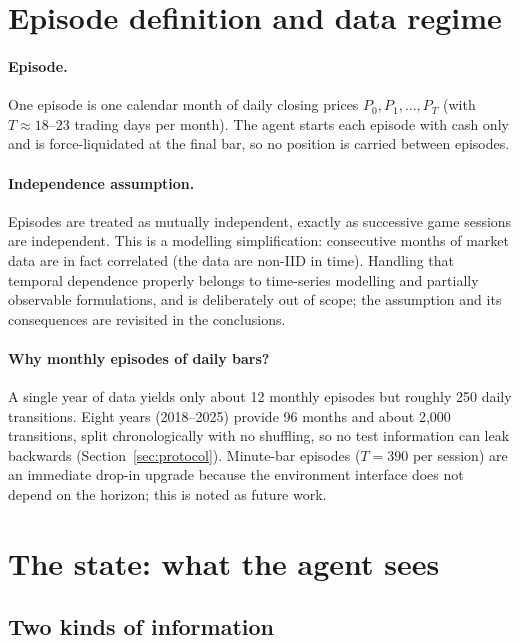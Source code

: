 \section{Episode definition and data regime}
\label{sec:episode}

\paragraph{Episode.} One episode is one calendar month of daily closing
prices $P_0, P_1, \dots, P_T$ (with $T \approx 18$--$23$ trading days per
month). The agent starts each episode with cash only and is force-liquidated
at the final bar, so no position is carried between episodes.

\paragraph{Independence assumption.} Episodes are treated as mutually
independent, exactly as successive game sessions are independent. This is
a modelling simplification: consecutive months of market data are in fact
correlated (the data are non-IID in time). Handling that temporal
dependence properly belongs to time-series modelling and partially
observable formulations, and is deliberately out of scope; the assumption
and its consequences are revisited in the conclusions.

\paragraph{Why monthly episodes of daily bars?} A single year of data
yields only about 12 monthly episodes but roughly 250 daily transitions.
Eight years (2018--2025) provide 96 months and about 2{,}000 transitions,
split chronologically with no shuffling, so no test information can leak
backwards (Section~\ref{sec:protocol}). Minute-bar episodes
($T{=}390$ per session) are an immediate drop-in upgrade because the
environment interface does not depend on the horizon; this is noted as
future work.

\section{The state: what the agent sees}
\label{sec:state}

\subsection{Two kinds of information}
\label{sec:state_two_halves}

